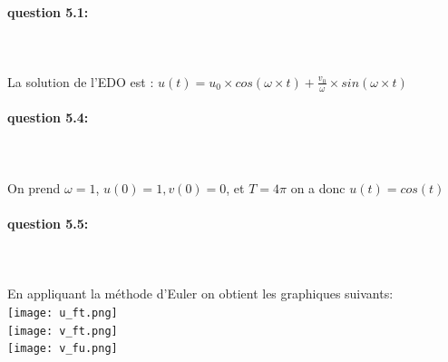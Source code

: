 \documentclass{article}
\begin{document}
\paragraph{question 5.1:}
~~\\
\\
La solution de l'EDO est : $u(t)=u_0\times{cos(\omega\times{t})}+\frac{v_0}{\omega}\times{sin(\omega\times{t})}$
\\
\paragraph{question 5.4:}
~~\\
\\
On prend $\omega=1$, $u(0)=1, v(0)=0$, et $T=4\pi$
on a donc $u(t)=cos(t)$
\paragraph{question 5.5:}
~~\\
\\
En appliquant la méthode d'Euler on obtient les graphiques suivants:
\\
\texttt{[image: u\_ft.png]}
\\
\texttt{[image: v\_ft.png]}
\\
\texttt{[image: v\_fu.png]}
\\
\end{document}
